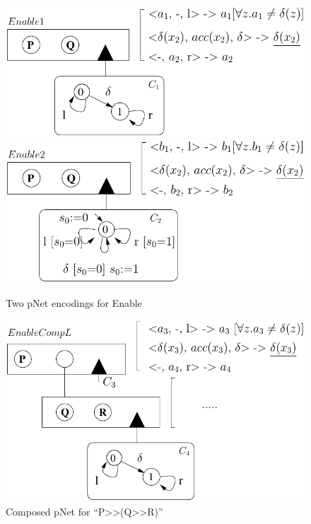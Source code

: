 \documentclass[smallcondensed]{svjour3}
\begin{document}
\begin{figure}[t]
\begin{minipage}{6.1cm}

  \includegraphics[width=\linewidth]{XFIG/Enable1}
  \\[1.3ex]
 \includegraphics[width=\linewidth]{XFIG/Enable2}
  \caption{Two pNet encodings for  Enable }  \label{schema:enable-pnets}
\end{minipage}
  \hspace{2mm}
\begin{minipage}{6cm}
  \includegraphics[width=\linewidth]{XFIG/P-QR}
  \caption{Composed pNet for ``P>>(Q>>R)''}  \label{schema:enable-composed}
\end{minipage}

\end{figure}
\end{document}
